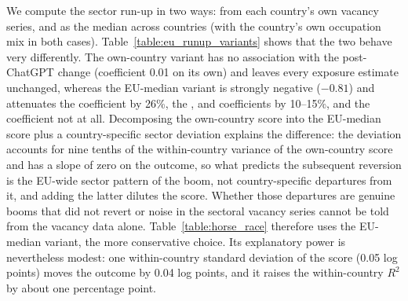 \documentclass[11pt]{article}
\begin{document}
We compute the sector run-up in two ways: from each country's own vacancy series, and as the median across countries (with the country's own occupation mix in both cases). Table~\ref{table:eu_runup_variants} shows that the two behave very differently. The own-country variant has no association with the post-ChatGPT change (coefficient 0.01 on its own) and leaves every exposure estimate unchanged, whereas the EU-median variant is strongly negative ($-0.81$) and attenuates the \citet{demirev2024assessing} coefficient by 26\%, the \citet{felten_method_2018}, \citet{eloundou_gpts_2023} and \citet{handa2025economic} coefficients by 10--15\%, and the \citet{webb_impact_2022} coefficient not at all. Decomposing the own-country score into the EU-median score plus a country-specific sector deviation explains the difference: the deviation accounts for nine tenths of the within-country variance of the own-country score and has a slope of zero on the outcome, so what predicts the subsequent reversion is the EU-wide sector pattern of the boom, not country-specific departures from it, and adding the latter dilutes the score. Whether those departures are genuine booms that did not revert or noise in the sectoral vacancy series cannot be told from the vacancy data alone. Table~\ref{table:horse_race} therefore uses the EU-median variant, the more conservative choice. Its explanatory power is nevertheless modest: one within-country standard deviation of the score (0.05 log points) moves the outcome by 0.04 log points, and it raises the within-country $R^2$ by about one percentage point.
\end{document}
